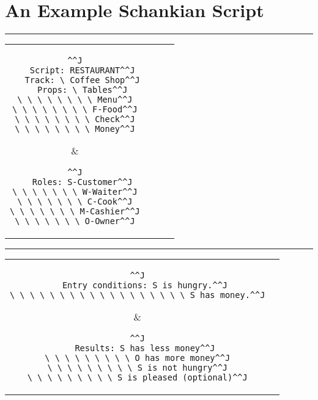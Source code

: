 \chapter{An Example Schankian Script}
\label{appendix:egschankscript}

\vspace*{-1cm}


\par\noindent\rule{\textwidth}{0.4pt}
\begin{tabular*}{\textwidth}{c c c c}
  \parbox{0.5\textwidth}{\begin{lstlisting}^^J
   Script: RESTAURANT^^J
   Track: \ Coffee Shop^^J
   Props: \ Tables^^J
\ \ \ \ \ \ \ \ Menu^^J
\ \ \ \ \ \ \ \ F-Food^^J
\ \ \ \ \ \ \ \ Check^^J
\ \ \ \ \ \ \ \ Money^^J
  \end{lstlisting}
  } & \parbox{0.5\textwidth}{\begin{lstlisting}^^J
   Roles: S-Customer^^J
\ \ \ \ \ \ \ W-Waiter^^J
\ \ \ \ \ \ \ C-Cook^^J
\ \ \ \ \ \ \ M-Cashier^^J
\ \ \ \ \ \ \ O-Owner^^J
  \end{lstlisting}}
 \end{tabular*}
 
\par\noindent\rule{\textwidth}{0.4pt}
\begin{tabular*}{\textwidth}{c c}
\parbox{0.5\textwidth}{\begin{lstlisting}^^J
   Entry conditions: S is hungry.^^J
\ \ \ \ \ \ \ \ \ \ \ \ \ \ \ \ \ \ S has money.^^J
\end{lstlisting}} & \parbox{0.5\textwidth}{\begin{lstlisting}^^J
   Results: S has less money^^J
\ \ \ \ \ \ \ \ \ O has more money^^J
\ \ \ \ \ \ \ \ \ S is not hungry^^J
\ \ \ \ \ \ \ \ \ S is pleased (optional)^^J
\end{lstlisting}}
 \end{tabular*}
 
